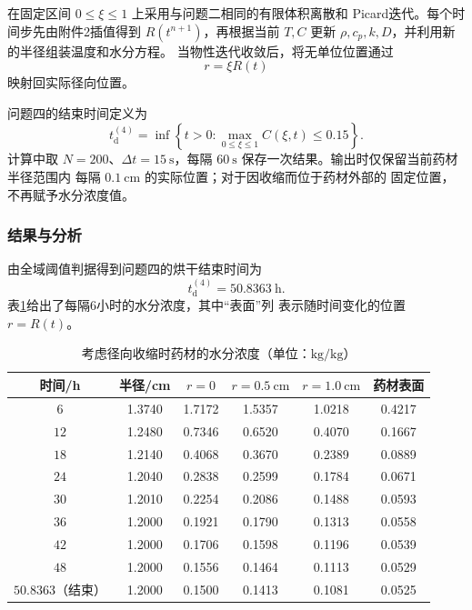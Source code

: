 \documentclass[12pt,a4paper]{article}
\renewcommand{\boxed}[1]{#1}
\begin{document}
\begin{center}
在固定区间 $0\leq\xi\leq1$ 上采用与问题二相同的有限体积离散和
Picard迭代。每个时间步先由附件2插值得到 $R(t^{n+1})$，再根据当前
$T,C$ 更新 $\rho,c_p,k,D$，并利用新的半径组装温度和水分方程。
当物性迭代收敛后，将无单位位置通过
\begin{equation}
r=\xi R(t)
\label{eq:q4-back-transform}
\end{equation}
映射回实际径向位置。

问题四的结束时间定义为
\begin{equation}
\boxed{
t_{\mathrm d}^{(4)}
=\inf\left\{t>0:
\max_{0\leq\xi\leq1}C(\xi,t)\leq0.15\right\}
}.
\label{eq:q4-dry-time}
\end{equation}
计算中取 $N=200$、$\Delta t=15\ \mathrm{s}$，每隔
$60\ \mathrm{s}$ 保存一次结果。输出时仅保留当前药材半径范围内
每隔 $0.1\ \mathrm{cm}$ 的实际位置；对于因收缩而位于药材外部的
固定位置，不再赋予水分浓度值。

\subsubsection{结果与分析}

由全域阈值判据得到问题四的烘干结束时间为
\begin{equation}
\boxed{t_{\mathrm d}^{(4)}=50.8363\ \mathrm{h}}.
\label{eq:q4-result-time}
\end{equation}
表\ref{tab:q4-moisture}给出了每隔6小时的水分浓度，其中“表面”列
表示随时间变化的位置 $r=R(t)$。

\begin{table}[H]
\centering
\caption{考虑径向收缩时药材的水分浓度（单位：$\mathrm{kg/kg}$）}
\label{tab:q4-moisture}
\begin{tabular}{cccccc}
\toprule
时间/h & 半径/cm & $r=0$ & $r=0.5\ \mathrm{cm}$
& $r=1.0\ \mathrm{cm}$ & 药材表面\\
\midrule
$6$  & 1.3740 & 1.7172 & 1.5357 & 1.0218 & 0.4217\\
$12$ & 1.2480 & 0.7346 & 0.6520 & 0.4070 & 0.1667\\
$18$ & 1.2140 & 0.4068 & 0.3670 & 0.2389 & 0.0889\\
$24$ & 1.2040 & 0.2838 & 0.2599 & 0.1784 & 0.0671\\
$30$ & 1.2010 & 0.2254 & 0.2086 & 0.1488 & 0.0593\\
$36$ & 1.2000 & 0.1921 & 0.1790 & 0.1313 & 0.0558\\
$42$ & 1.2000 & 0.1706 & 0.1598 & 0.1196 & 0.0539\\
$48$ & 1.2000 & 0.1556 & 0.1464 & 0.1113 & 0.0529\\
$50.8363$（结束） & 1.2000 & 0.1500 & 0.1413 & 0.1081 & 0.0525\\
\bottomrule
\end{tabular}
\end{table}


\end{center}
\end{document}

